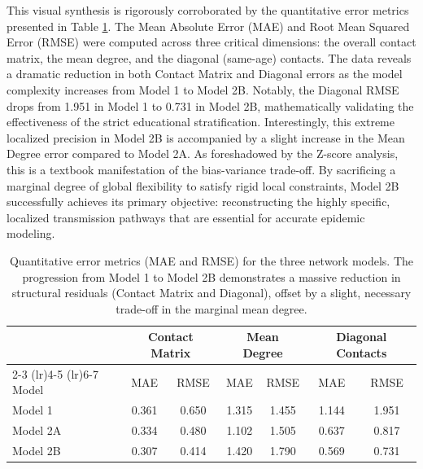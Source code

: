 This visual synthesis is rigorously corroborated by the quantitative error metrics presented in Table \ref{tab:model_errors}.
The Mean Absolute Error (MAE) and Root Mean Squared Error (RMSE) were computed across three critical dimensions: the overall contact matrix, the mean degree, and the diagonal (same-age) contacts.
The data reveals a dramatic reduction in both Contact Matrix and Diagonal errors as the model complexity increases from Model 1 to Model 2B.
Notably, the Diagonal RMSE drops from 1.951 in Model 1 to 0.731 in Model 2B, mathematically validating the effectiveness of the strict educational stratification.
Interestingly, this extreme localized precision in Model 2B is accompanied by a slight increase in the Mean Degree error compared to Model 2A.
As foreshadowed by the Z-score analysis, this is a textbook manifestation of the bias-variance trade-off.
By sacrificing a marginal degree of global flexibility to satisfy rigid local constraints, Model 2B successfully achieves its primary objective: reconstructing the highly specific, localized transmission pathways that are essential for accurate epidemic modeling.

\begin{table}[H]
    \centering
    \caption{Quantitative error metrics (MAE and RMSE) for the three network models. The progression from Model 1 to Model 2B demonstrates a massive reduction in structural residuals (Contact Matrix and Diagonal), offset by a slight, necessary trade-off in the marginal mean degree.}
    \label{tab:model_errors}
    \begin{tabular}{lcccccc}
        \toprule
        & \multicolumn{2}{c}{Contact Matrix} & \multicolumn{2}{c}{Mean Degree} & \multicolumn{2}{c}{Diagonal Contacts} \\
        \cmidrule(lr){2-3} \cmidrule(lr){4-5} \cmidrule(lr){6-7}
        Model & MAE & RMSE & MAE & RMSE & MAE & RMSE \\
        \midrule
        Model 1  & 0.361 & 0.650 & 1.315 & 1.455 & 1.144 & 1.951 \\
        Model 2A & 0.334 & 0.480 & 1.102 & 1.505 & 0.637 & 0.817 \\
        Model 2B & 0.307 & 0.414 & 1.420 & 1.790 & 0.569 & 0.731 \\
        \bottomrule
    \end{tabular}
\end{table}